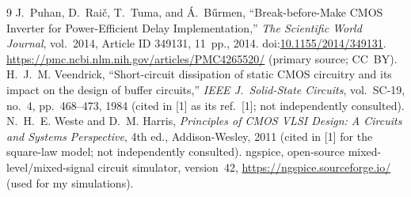 \documentclass[11pt,a4paper]{article}
\begin{document}
\begin{thebibliography}{9}
   J.~Puhan, D.~Rai\v{c}, T.~Tuma, and \'A.~B\H{u}rmen, ``Break-before-Make CMOS Inverter for Power-Efficient Delay Implementation,'' \emph{The Scientific World Journal}, vol.~2014, Article ID 349131, 11~pp., 2014. doi:\href{https://doi.org/10.1155/2014/349131}{10.1155/2014/349131}. \url{https://pmc.ncbi.nlm.nih.gov/articles/PMC4265520/} (primary source; CC~BY).
   H.~J.~M. Veendrick, ``Short-circuit dissipation of static CMOS circuitry and its impact on the design of buffer circuits,'' \emph{IEEE J.\ Solid-State Circuits}, vol.~SC-19, no.~4, pp.~468--473, 1984 (cited in [1] as its ref.~[1]; not independently consulted).
   N.~H.~E. Weste and D.~M. Harris, \emph{Principles of CMOS VLSI Design: A Circuits and Systems Perspective}, 4th ed., Addison-Wesley, 2011 (cited in [1] for the square-law model; not independently consulted).
   ngspice, open-source mixed-level/mixed-signal circuit simulator, version~42, \url{https://ngspice.sourceforge.io/} (used for my simulations).
\end{thebibliography}
\end{document}
